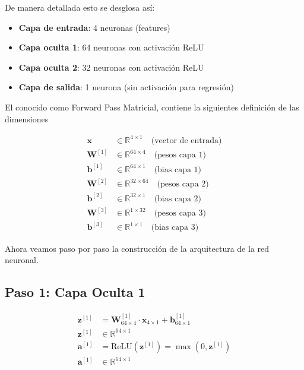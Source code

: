 \documentclass[12pt]{article}
\begin{document}
De manera detallada esto se desglosa así:

\begin{itemize}
\item \textbf{Capa de entrada}: 4 neuronas (features)
\item \textbf{Capa oculta 1}: 64 neuronas con activación ReLU
\item \textbf{Capa oculta 2}: 32 neuronas con activación ReLU  
\item \textbf{Capa de salida}: 1 neurona (sin activación para regresión)
\end{itemize}

El conocido como Forward Pass Matricial, contiene la siguientes definición de las dimensiones

\begin{align}
\mathbf{x} &\in \mathbb{R}^{4 \times 1} \quad \text{(vector de entrada)} \\
\mathbf{W}^{[1]} &\in \mathbb{R}^{64 \times 4} \quad \text{(pesos capa 1)} \\
\mathbf{b}^{[1]} &\in \mathbb{R}^{64 \times 1} \quad \text{(bias capa 1)} \\
\mathbf{W}^{[2]} &\in \mathbb{R}^{32 \times 64} \quad \text{(pesos capa 2)} \\
\mathbf{b}^{[2]} &\in \mathbb{R}^{32 \times 1} \quad \text{(bias capa 2)} \\
\mathbf{W}^{[3]} &\in \mathbb{R}^{1 \times 32} \quad \text{(pesos capa 3)} \\
\mathbf{b}^{[3]} &\in \mathbb{R}^{1 \times 1} \quad \text{(bias capa 3)}
\end{align}

Ahora veamos paso por paso la construcción de la arquitectura de la red neuronal.

\subsection{Paso 1: Capa Oculta 1}

\begin{align}
\mathbf{z}^{[1]} &= \mathbf{W}^{[1]}_{64 \times 4} \cdot \mathbf{x}_{4 \times 1} + \mathbf{b}^{[1]}_{64 \times 1} \\
\mathbf{z}^{[1]} &\in \mathbb{R}^{64 \times 1} \\
\mathbf{a}^{[1]} &= \text{ReLU}(\mathbf{z}^{[1]}) = \max(0, \mathbf{z}^{[1]}) \\
\mathbf{a}^{[1]} &\in \mathbb{R}^{64 \times 1}
\end{align}
\end{document}
